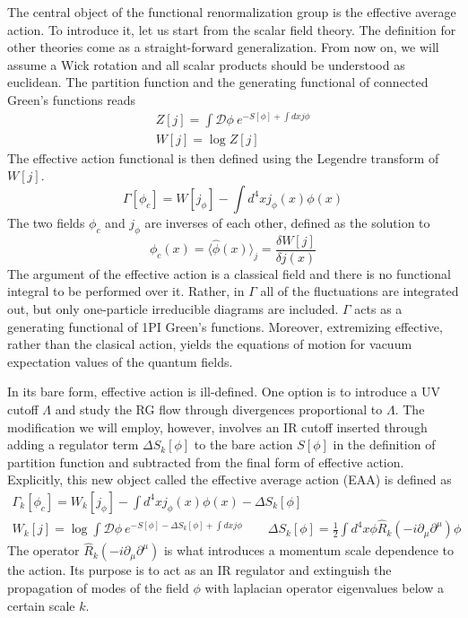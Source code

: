 \documentclass[11pt, a4paper]{article}
\begin{document}
The central object of the functional renormalization group is the effective average action.
To introduce it, let us start from the scalar field theory. The definition for other theories come as a straight-forward generalization.
From now on, we will assume a Wick rotation
and all scalar products should be understood as euclidean.
The partition function and the generating functional of connected Green's functions reads
\begin{gather}
    Z[j] = \int \mathcal{D}\phi \ e^{-S[\phi] + \int dx j \phi} \\
    W[j] = \log{Z[j]}
\end{gather}
The effective action functional is then defined using the Legendre transform of $W[j]$.
\begin{equation}
    \Gamma[\phi_c] = W[j_\phi] - \int d^4 x j_\phi(x) \phi(x)
\end{equation}
The two fields $\phi_c$ and $j_\phi$ are inverses of each other, defined as the solution to
\begin{equation}
    \phi_c(x) = \langle \hat\phi (x) \rangle_j = \frac{\delta W[j]}{\delta j(x)}
\end{equation}
The argument of the effective action is a classical field and there is no functional integral to be performed over it.
Rather, in $\Gamma$ all of the fluctuations are integrated out, but only one-particle irreducible diagrams
are included. $\Gamma$ acts as a generating functional of 1PI Green's functions. Moreover, extremizing effective, rather than
the clasical action, yields the equations of motion for vacuum expectation values of the quantum fields.

In its bare form, effective action is ill-defined. One option is to introduce a UV cutoff $\Lambda$
and study the RG flow through divergences proportional to $\Lambda$. The modification we will employ, however, involves
an IR cutoff inserted through adding a regulator term $\Delta S_k[\phi]$ to the bare action $S[\phi]$ in the definition of partition function
and subtracted from the final form of effective action. Explicitly, this new object called the effective average action (EAA) is defined as
\begin{gather}
    \Gamma_k[\phi_c] = W_k[j_\phi] - \int d^4 x j_\phi(x) \phi(x) - \Delta S_k[\phi]\\
    W_k[j] = \log{\int \mathcal{D}\phi \ e^{-S[\phi] - \Delta S_k[\phi] + \int dx j \phi}} \qquad \Delta S_k[\phi] = \frac{1}{2}\int d^4 x \phi \hat{R}_k (-i\partial_{\mu}\partial^{\mu}) \phi
\end{gather}
The operator $\hat{R}_k (-i\partial_{\mu}\partial^{\mu})$ is what introduces a momentum scale dependence to the action.
Its purpose is to act as an IR regulator and extinguish the propagation of modes of the field $\phi$ with laplacian operator eigenvalues below a certain scale $k$.
\end{document}
